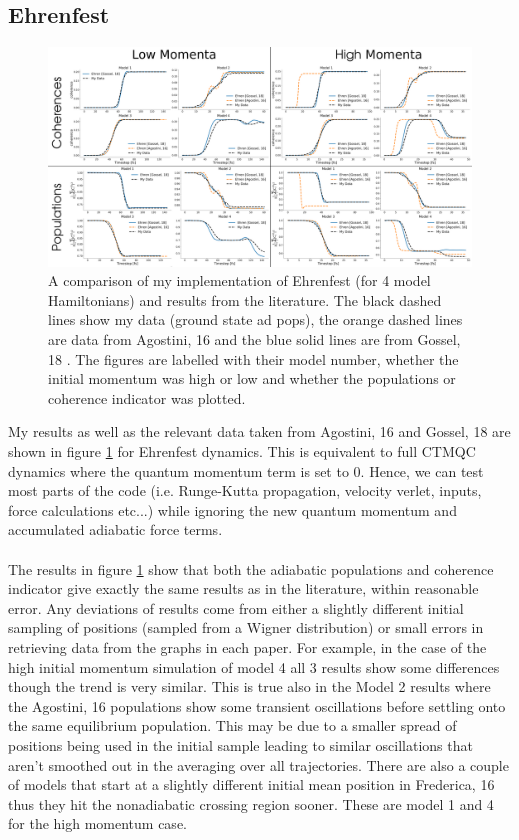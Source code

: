 \subsection{Ehrenfest}
\begin{figure}[h]
	\includegraphics[width=\textwidth]{img/CTMQC/TullyModels/Ehren_LitComp.png}
	\caption{\label{fig:LitCompEhrenTully}A comparison of my implementation of Ehrenfest (for 4 model Hamiltonians) and results from the literature. The black dashed lines show my data (ground state ad pops), the orange dashed lines are data from Agostini, 16 \cite{agostini_quantum-classical_2016} and the blue solid lines are from Gossel, 18 \cite{gossel_coupled-trajectory_2018}. The figures are labelled with their model number, whether the initial momentum was high or low and whether the populations or coherence indicator was plotted.}
\end{figure}
\noindent My results as well as the relevant data taken from Agostini, 16 and Gossel, 18 \cite{agostini_quantum-classical_2016, gossel_coupled-trajectory_2018} are shown in figure \ref{fig:LitCompEhrenTully} for Ehrenfest dynamics. This is equivalent to full CTMQC dynamics where the quantum momentum term is set to 0. Hence, we can test most parts of the code (i.e. Runge-Kutta propagation, velocity verlet, inputs, force calculations etc...) while ignoring the new quantum momentum and accumulated adiabatic force terms.
\\\\
The results in figure \ref{fig:LitCompEhrenTully} show that both the adiabatic populations and coherence indicator give exactly the same results as in the literature, within reasonable error. Any deviations of results come from either a slightly different initial sampling of positions (sampled from a Wigner distribution) or small errors in retrieving data from the graphs in each paper. For example, in the case of the high initial momentum simulation of model 4 all 3 results show some differences though the trend is very similar. This is true also in the Model 2 results where the Agostini, 16 populations show some transient oscillations before settling onto the same equilibrium population. This may be due to a smaller spread of positions being used in the initial sample leading to similar oscillations that aren't smoothed out in the averaging over all trajectories. There are also a couple of models that start at a slightly different initial mean position in Frederica, 16 thus they hit the nonadiabatic crossing region sooner. These are model 1 and 4 for the high momentum case.
